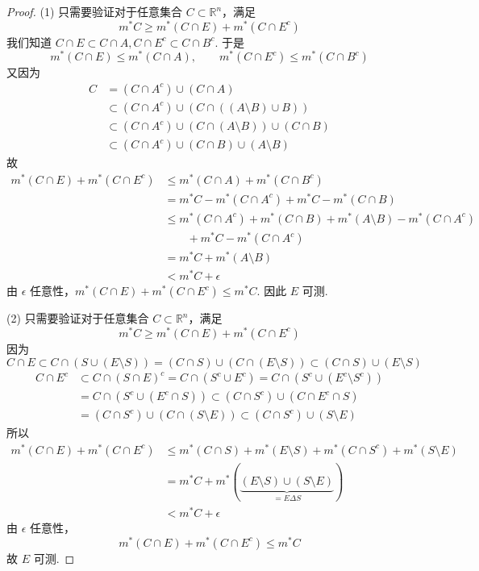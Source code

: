 \begin{proof}
(1) 只需要验证对于任意集合 $C\subset \mathbb{R}^{n}$，满足
\[
m^{*}C\geq m^{*}(C\cap E)+m^{*}(C\cap E^{c})
\]
我们知道 $C\cap E\subset C\cap A,C\cap E^{c}\subset C\cap B^{c}$. 于是
\[
m^{*}(C\cap E)\leq m^{*}(C\cap A),\qquad m^{*}(C\cap E^{c})\leq m^{*}(C\cap B^{c})
\]
又因为
\[
\begin{aligned}
C & =(C\cap A^{c})\cup(C\cap A) \\
 & \subset(C\cap A^{c})\cup(C\cap((A\setminus B)\cup B)) \\
 & \subset(C\cap A^{c})\cup(C\cap(A\setminus B))\cup(C\cap B) \\
 & \subset(C\cap A^{c})\cup(C\cap B)\cup(A\setminus B)
\end{aligned}
\]
故
\[
\begin{aligned}
m^{*}(C\cap E)+m^{*}(C\cap E^{c}) & \leq m^{*}(C\cap A)+m^{*}(C\cap B^{c}) \\
 & =m^{*}C-m^{*}(C\cap A^{c})+m^{*}C-m^{*}(C\cap B) \\
 & \leq m^{*}(C\cap A^{c})+m^{*}(C\cap B)+m^{*}(A\setminus B)-m^{*}(C\cap A^{c}) \\
 &\qquad +m^{*}C-m^{*}(C\cap A^{c}) \\
 & =m^{*}C+m^{*}(A\setminus B) \\
 & <m^{*}C+\epsilon
\end{aligned}
\]
由 $\epsilon$ 任意性，$m^{*}(C\cap E)+m^{*}(C\cap E^{c})\leq m^{*}C$. 因此 $E$ 可测.

(2) 只需要验证对于任意集合 $C\subset \mathbb{R}^{n}$，满足
\[
m^{*}C\geq m^{*}(C\cap E)+m^{*}(C\cap E^{c})
\]
因为
\[
C\cap E\subset C\cap(S\cup(E\setminus S))=(C\cap S)\cup(C\cap(E\setminus S))\subset(C\cap S)\cup(E\setminus S)
\]
\[
\begin{aligned}
C\cap E^{c} & \subset C\cap(S\cap E)^{c}=C\cap(S^{c}\cup E^{c})=C\cap(S^{c}\cup(E^{c}\setminus S^{c})) \\
 & =C\cap(S^{c}\cup(E^{c}\cap S)) \subset (C\cap S^{c})\cup(C\cap E^{c}\cap S) \\
 & =(C\cap S^{c})\cup(C\cap(S\setminus E))\subset(C\cap S^{c})\cup(S\setminus E)
\end{aligned}
\]
所以
\[
\begin{aligned}
m^{*}(C\cap E)+m^{*}(C\cap E^{c}) & \leq m^{*}(C\cap S)+m^{*}(E\setminus S)+m^{*}(C\cap S^{c})+m^{*}(S\setminus E) \\
 & =m^{*}C+m^{*}(\underbrace{ (E\setminus S)\cup(S\setminus E) }_{ =E\Delta S }) \\
 & <m^{*}C+\epsilon
\end{aligned}
\]
由 $\epsilon$ 任意性，
\[
m^{*}(C\cap E)+m^{*}(C\cap E^{c})\leq m^{*}C
\]
故 $E$ 可测.


\end{proof}
